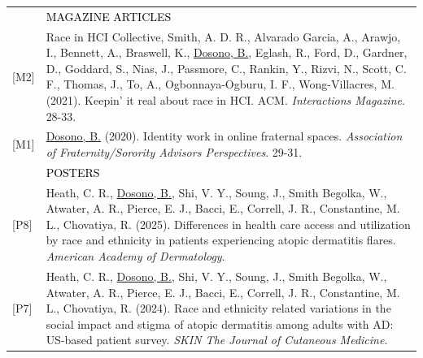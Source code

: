 \documentclass[12pt]{article}
\begin{document}
{\begin{longtable}{R{0.75in}p{5.0in}}
& \large \textcolor{black}{\uppercase{Magazine Articles}}\\

\footnotesize{[M2]} & {Race in HCI Collective, Smith, A. D. R., Alvarado Garcia, A., Arawjo, I., Bennett, A., Braswell, K., \href{https://dl.acm.org/doi/10.1145/3477097?cid=88158835957}{Dosono, B.}, Eglash, R., Ford, D., Gardner, D., Goddard, S., Nias, J.,  Passmore, C., Rankin, Y., Rizvi, N., Scott, C. F., Thomas, J., To, A., Ogbonnaya-Ogburu, I. F., Wong-Villacres, M.} (2021). Keepin' it real about race in HCI. ACM. \textit{Interactions Magazine}. 28-33.\\

\footnotesize{[M1]} & \href{https://web.archive.org/web/20240726035655/https://issuu.com/afa1976/docs/afa-perspectives-2019-issue4-final-nobleed}{Dosono, B.} (2020). Identity work in online fraternal spaces. \textit{Association of Fraternity/Sorority Advisors Perspectives}. 29-31. \medskip \\

& \large \textcolor{black}{\uppercase{Posters}}\\




\footnotesize{[P8]} & Heath, C. R., \href{https://eposters.aad.org/abstracts/60940}{Dosono, B.}, Shi, V. Y., Soung, J., Smith Begolka, W., Atwater, A. R., Pierce, E. J., Bacci, E., Correll, J. R., Constantine, M. L., Chovatiya, R. (2025). Differences in health care access and utilization by race and ethnicity in patients experiencing atopic dermatitis flares. \textit{American Academy of Dermatology}.\\

\footnotesize{[P7]} & Heath, C. R., \href{https://doi.org/10.25251/skin.9.supp.518}{Dosono, B.}, Shi, V. Y., Soung, J., Smith Begolka, W., Atwater, A. R., Pierce, E. J., Bacci, E., Correll, J. R., Constantine, M. L., Chovatiya, R. (2024). Race and ethnicity related variations in the social impact and stigma of atopic dermatitis among adults with AD: US-based patient survey. \textit{SKIN The Journal of Cutaneous Medicine}.\\


\end{longtable}}
\end{document}
